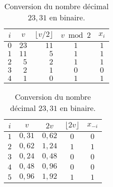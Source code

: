 \documentclass[11pt,article,french]{memoir}
\begin{document}
\begin{table}
  \caption{Conversion du nombre décimal $23,31$ en binaire.}
  \begin{minipage}[t]{0.45\linewidth}
    \begin{tabular*}{\linewidth}{crrcc}
      \toprule
      $i$ & \multicolumn{1}{c}{$v$} & $\lfloor v/2 \rfloor$ & $v \bmod 2$ & $x_i$ \\
      \midrule
      $0$ & $23$ & $11$ & $1$ & $1$ \\
      $1$ & $11$ &  $5$ & $1$ & $1$ \\
      $2$ &  $5$ &  $2$ & $1$ & $1$ \\
      $3$ &  $2$ &  $1$ & $0$ & $0$ \\
      $4$ &  $1$ &  $0$ & $1$ & $1$ \\
      \bottomrule
    \end{tabular*}
  \end{minipage}
  \hfill
  \begin{minipage}[t]{0.45\linewidth}
    \begin{tabular*}{\linewidth}{ccccc}
      \toprule
      $i$ & $v$ & $2v$ & $\lfloor 2v \rfloor$ & $x_{-i}$ \\
      \midrule
      $1$ & $0,31$ & $0,62$ & $0$ & $0$ \\
      $2$ & $0,62$ & $1,24$ & $1$ & $1$ \\
      $3$ & $0,24$ & $0,48$ & $0$ & $0$ \\
      $4$ & $0,48$ & $0,96$ & $0$ & $0$ \\
      $5$ & $0,96$ & $1,92$ & $1$ & $1$ \\
      \bottomrule
    \end{tabular*}
  \end{minipage}
\end{table}
\end{document}
